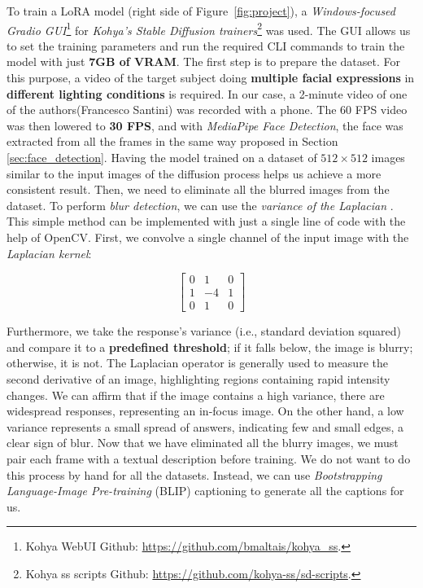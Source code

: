 \documentclass[sn-mathphys,Numbered]{sn-jnl}
\theoremstyle{thmstyleone}%
\theoremstyle{thmstyletwo}%
\theoremstyle{thmstylethree}%
\begin{document}
To train a LoRA model (right side of Figure~\ref{fig:project}), a \emph{Windows-focused Gradio GUI}\footnote{Kohya WebUI Github: \url{https://github.com/bmaltais/kohya_ss}.} for \emph{Kohya's Stable Diffusion trainers}\footnote{Kohya ss scripts Github: \url{https://github.com/kohya-ss/sd-scripts}.} was used. 
The GUI allows us to set the training parameters and run the required 
CLI commands to train the model with just \textbf{7GB of VRAM}. 
The first step is to prepare the dataset. For this purpose, 
a video of the target subject doing \textbf{multiple facial expressions} in \textbf{different lighting conditions} 
is required. In our case, a 2-minute video of one of the authors(Francesco Santini) was recorded with a phone. 
The 60 FPS video was then lowered to \textbf{30 FPS}, and with \emph{MediaPipe Face Detection},
the face was extracted from all the frames in the same way proposed in Section \ref{sec:face_detection}.
Having the model trained on a dataset of $512\times 512$ images similar to the input images 
of the diffusion process helps us achieve a more consistent result. 
Then, we need to eliminate all the blurred images from the dataset. 
To perform \emph{blur detection}, we can use the \emph{variance of the Laplacian} \cite{903548}. 
This simple method can be implemented with just a single line of code with the help of OpenCV. 
First, we convolve a single channel of the input image with the \emph{Laplacian kernel}:

\begin{equation}
	\begin{bmatrix}
		0 & 1 & 0\\
		1 & -4 & 1\\
		0 & 1 & 0
	\end{bmatrix}
\end{equation}

Furthermore, we take the response's variance (i.e., standard deviation squared) 
and compare it to a \textbf{predefined threshold}; if it falls below, the image is blurry; otherwise, it is not.
The Laplacian operator is generally used to measure the second derivative of an image, 
highlighting regions containing rapid intensity changes. 
We can affirm that if the image contains a high variance, there are widespread responses, 
representing an in-focus image. On the other hand, a  low variance represents a small spread of answers, 
indicating few and small edges, a clear sign of blur.
Now that we have eliminated all the blurry images, 
we must pair each frame with a textual description before training. 
We do not want to do this process by hand for all the datasets. 
Instead, we can use \emph{Bootstrapping Language-Image Pre-training} (BLIP) captioning \cite{li2022blip} 
to generate all the captions for us. 
\end{document}
